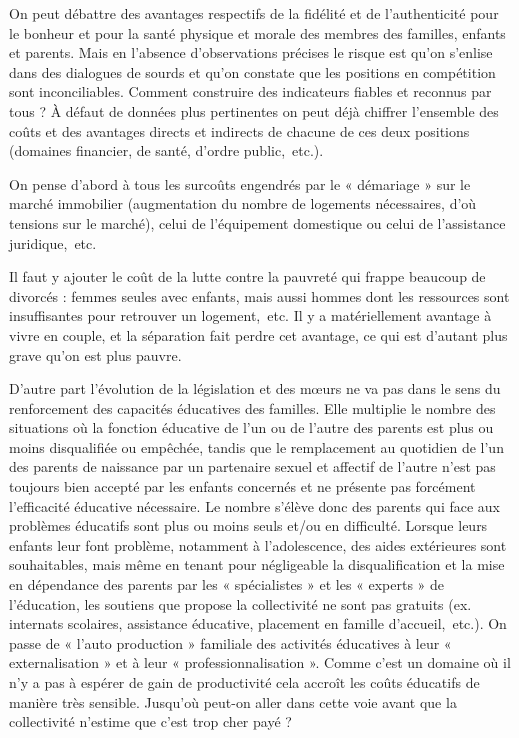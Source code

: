 On peut débattre des avantages respectifs de la fidélité et de l'authenticité pour le bonheur et pour la santé physique et morale des membres des familles, enfants et parents. Mais en l'absence d'observations précises le risque est qu'on s'enlise dans des dialogues de sourds et qu'on constate que les positions en compétition sont inconciliables. Comment construire des indicateurs fiables et reconnus par tous ? À défaut de données plus pertinentes on peut déjà chiffrer l'ensemble des coûts et des avantages directs et indirects de chacune de ces deux positions (domaines financier, de santé, d'ordre public,~etc.). 

On pense d'abord à tous les surcoûts engendrés par le « démariage » sur le marché immobilier (augmentation du nombre de logements nécessaires, d'où tensions sur le marché), celui de l'équipement domestique ou celui de l'assistance juridique,~etc. 

Il faut y ajouter le coût de la lutte contre la pauvreté qui frappe beaucoup de divorcés : femmes seules avec enfants, mais aussi hommes dont les ressources sont insuffisantes pour retrouver un logement,~etc. Il y a matériellement avantage à vivre en couple, et la séparation fait perdre cet avantage, ce qui est d'autant plus grave qu'on est plus pauvre.

D'autre part l'évolution de la législation et des mœurs ne va pas dans le sens du renforcement des capacités éducatives des familles. Elle multiplie le nombre des situations où la fonction éducative de l'un ou de l'autre des parents est plus ou moins disqualifiée ou empêchée, tandis que le remplacement au quotidien de l'un des parents de naissance par un partenaire sexuel et affectif de l'autre n'est pas toujours bien accepté par les enfants concernés et ne présente pas forcément l'efficacité éducative nécessaire. Le nombre s'élève donc des parents qui face aux problèmes éducatifs sont plus ou moins seuls et/ou en difficulté. Lorsque leurs enfants leur font problème, notamment à l'adolescence, des aides extérieures sont souhaitables, mais même en tenant pour négligeable la disqualification et la mise en dépendance des parents par les « spécialistes » et les « experts » de l'éducation, les soutiens que propose la collectivité ne sont pas gratuits (ex. internats scolaires, assistance éducative, placement en famille d'accueil,~etc.). On passe de « l'auto production » familiale des activités éducatives à leur « externalisation » et à leur « professionnalisation ». Comme c'est un domaine où il n'y a pas à espérer de gain de productivité cela accroît les coûts éducatifs de manière très sensible. Jusqu'où peut-on aller dans cette voie avant que la collectivité n'estime que c'est trop cher payé ? 

